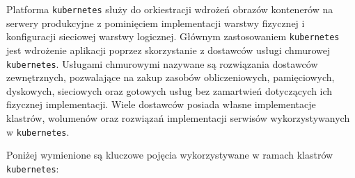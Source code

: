 \documentclass[12pt,twoside]{article}
\begin{document}
Platforma \texttt{kubernetes} służy do orkiestracji wdrożeń obrazów kontenerów na serwery produkcyjne z pominięciem implementacji warstwy fizycznej i konfiguracji sieciowej warstwy logicznej. Głównym zastosowaniem \texttt{kubernetes} jest wdrożenie aplikacji poprzez skorzystanie z dostawców usługi chmurowej \texttt{kubernetes}. Usługami chmurowymi nazywane są rozwiązania dostawców zewnętrznych, pozwalające na zakup zasobów obliczeniowych, pamięciowych, dyskowych, sieciowych oraz gotowych usług bez zamartwień dotyczących ich fizycznej implementacji. Wiele dostawców posiada własne implementacje klastrów, wolumenów oraz rozwiązań implementacji serwisów wykorzystywanych w \texttt{kubernetes}. 

Poniżej wymienione są kluczowe pojęcia wykorzystywane w ramach klastrów \texttt{kubernetes}:
\end{document}
